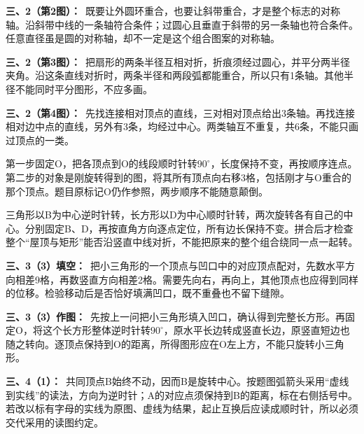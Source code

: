 \documentclass[multi=snippet,border=0pt]{standalone}
\newenvironment{snippet}[3]{\begin{minipage}{#1bp}\color{answerred}\fontsize{#2}{#3}\selectfont\raggedright}{\end{minipage}}
\begin{document}
\begin{snippet}{505}{11.5}{14}\textbf{三、2（第2图）：}\ 既要让外圆环重合，也要让斜带重合，才是整个标志的对称轴。沿斜带中线的一条轴符合条件；过圆心且垂直于斜带的另一条轴也符合条件。任意直径虽是圆的对称轴，却不一定是这个组合图案的对称轴。\end{snippet}
\begin{snippet}{505}{11.5}{14}\textbf{三、2（第3图）：}\ 把扇形的两条半径互相对折，折痕须经过圆心，并平分两半径夹角。沿这条直线对折时，两条半径和两段弧都能重合，所以只有1条轴。其他半径不能同时平分图形，不应多画。\end{snippet}
\begin{snippet}{505}{11.5}{14}\textbf{三、2（第4图）：}\ 先找连接相对顶点的直线，三对相对顶点给出3条轴。再找连接相对边中点的直线，另外有3条，均经过中心。两类轴互不重复，共6条，不能只画过顶点的一类。\end{snippet}
\begin{snippet}{505}{11.5}{14}第一步固定O，把各顶点到O的线段顺时针转\(90^\circ\)，长度保持不变，再按顺序连点。第二步的对象是刚旋转得到的图，将其所有顶点向右移3格，包括刚才与O重合的那个顶点。题目原标记O仍作参照，两步顺序不能随意颠倒。\end{snippet}
\begin{snippet}{505}{11.5}{14}三角形以B为中心逆时针转，长方形以D为中心顺时针转，两次旋转各有自己的中心。分别固定B、D，再按直角方向逐点定位，所有边长保持不变。拼合后才检查整个“屋顶与矩形”能否沿竖直中线对折，不能把原来的整个组合绕同一点一起转。\end{snippet}
\begin{snippet}{505}{11.5}{14}\textbf{三、3（3）填空：}\ 把小三角形的一个顶点与凹口中的对应顶点配对，先数水平方向相差9格，再数竖直方向相差2格。需要先向右，再向上，其他顶点也应得到同样的位移。检验移动后是否恰好填满凹口，既不重叠也不留下缝隙。\end{snippet}
\begin{snippet}{505}{11.5}{14}\textbf{三、3（3）作图：}\ 先按上一问把小三角形填入凹口，确认得到完整长方形。再固定O，将这个长方形整体逆时针转\(90^\circ\)，原水平长边转成竖直长边，原竖直短边也随之转向。逐顶点保持到O的距离，所得图形应在O左上方，不能只旋转小三角形。\end{snippet}
\begin{snippet}{505}{11.5}{14}\textbf{三、4（1）：}\ 共同顶点B始终不动，因而B是旋转中心。按题图弧箭头采用“虚线到实线”的读法，方向为逆时针；A的对应点须保持到B的距离，标在右侧括号中。若改以标有字母的实线为原图、虚线为结果，起止互换后应读成顺时针，所以必须交代采用的读图约定。\end{snippet}
\end{document}

